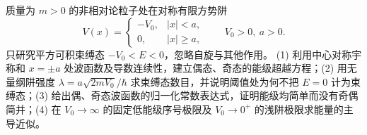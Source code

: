 质量为 \(m>0\) 的非相对论粒子处在对称有限方势阱
\[
V(x)=\begin{cases}-V_0,&|x|<a,\\0,&|x|\ge a,\end{cases}\qquad V_0>0,\ a>0 .
\]
只研究平方可积束缚态 \(-V_0<E<0\)，忽略自旋与其他作用。
(1) 利用中心对称宇称和 \(x=\pm a\) 处波函数及导数连续性，建立偶态、奇态的能级超越方程；(2) 用无量纲阱强度 \(\lambda=a\sqrt{2mV_0}/\hbar\) 求束缚态数目，并说明阈值处为何不把 \(E=0\) 计为束缚态；(3) 给出偶、奇态波函数的归一化常数表达式，证明能级均简单而没有奇偶简并；(4) 在 \(V_0\to\infty\) 的固定低能级序号极限及 \(V_0\to0^+\) 的浅阱极限求能量的主导近似。
